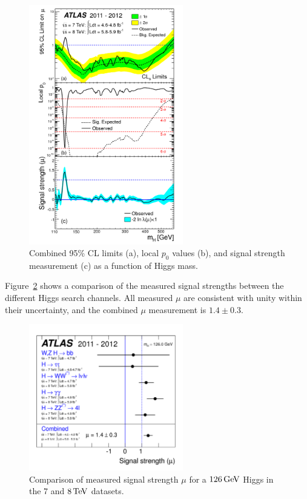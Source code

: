 \begin{figure}[h!]
  \centering
  \captionsetup{justification=centering}
  \includegraphics[width=0.6\textwidth]{figures/discovery_combined}
  \caption{Combined 95\% CL limits (a), local $p_0$ values (b), and signal strength measurement (c) as a function of Higgs mass\cite{Discovery}.}
  \label{fig:discovery_combined}
\end{figure}

Figure~\ref{fig:discovery_mu} shows a comparison of the measured signal strengths between the different Higgs search channels. All measured $\mu$ are consistent with unity within their uncertainty, and the combined $\mu$ measurement is $1.4 \pm 0.3$. 

\begin{figure}[h!]
  \centering
  \captionsetup{justification=centering}
  \includegraphics[width=0.6\textwidth]{figures/discovery_mu}
  \caption{Comparison of measured signal strength $\mu$ for a $126 \GeV$ Higgs in the $7$ and $8 \TeV$ datasets\cite{Discovery}.}
  \label{fig:discovery_mu}
\end{figure}

